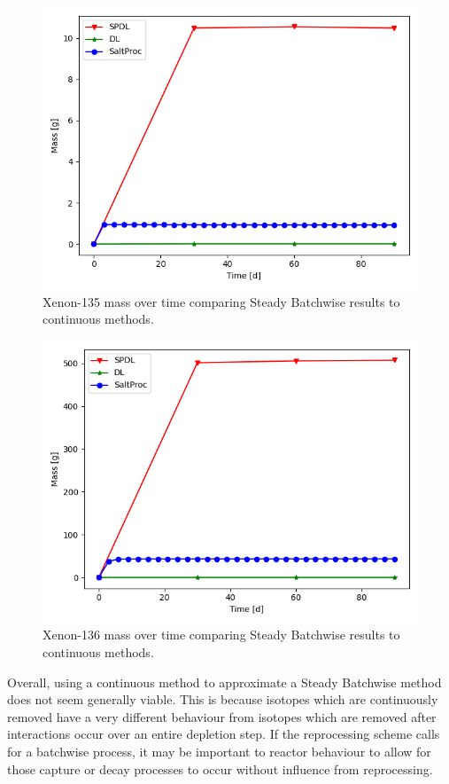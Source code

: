\begin{figure}[H]
  \centering
  \includegraphics[scale=0.7]{images/soln-1-2-xe135.png}
  \caption{Xenon-135 mass over time comparing Steady Batchwise results to continuous methods.}
   \label{fig:steady-compare-xe135}
\end{figure}

\begin{figure}[H]
  \centering
  \includegraphics[scale=0.7]{images/soln-1-2-xe136.png}
  \caption{Xenon-136 mass over time comparing Steady Batchwise results to continuous methods.}
   \label{fig:steady-compare-xe136}
\end{figure}

Overall, using a continuous method to approximate a Steady Batchwise method does not seem generally viable. This is because isotopes which are continuously removed have a very different behaviour from isotopes which are removed after interactions occur over an entire depletion step. If the reprocessing scheme calls for a batchwise process, it may be important to reactor behaviour to allow for those capture or decay processes to occur without influence from reprocessing.

